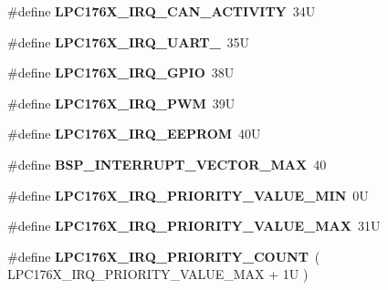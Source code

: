 \begin{DoxyCompactItemize}
\#define {\bfseries L\+P\+C176\+X\+\_\+\+I\+R\+Q\+\_\+\+C\+A\+N\+\_\+\+A\+C\+T\+I\+V\+I\+TY}~34U
\item 
\mbox{\label{group__bsp__interrupt_gaf81f39023853ed3450ee283a098018bb}} 
\#define {\bfseries L\+P\+C176\+X\+\_\+\+I\+R\+Q\+\_\+\+U\+A\+R\+T\+\_}~35U
\item 
\mbox{\label{group__bsp__interrupt_gaa4436fd9ee3ee9b28f0ffe563c03ef70}} 
\#define {\bfseries L\+P\+C176\+X\+\_\+\+I\+R\+Q\+\_\+\+G\+P\+IO}~38U
\item 
\mbox{\label{group__bsp__interrupt_ga1fde8394f565bde6a9b7adc08d360787}} 
\#define {\bfseries L\+P\+C176\+X\+\_\+\+I\+R\+Q\+\_\+\+P\+WM}~39U
\item 
\mbox{\label{group__bsp__interrupt_gad7230d2643d93b224dca1e8efb32bf14}} 
\#define {\bfseries L\+P\+C176\+X\+\_\+\+I\+R\+Q\+\_\+\+E\+E\+P\+R\+OM}~40U
\item 
\mbox{\label{group__bsp__interrupt_gae4a2cdda5816a4c83c2fac0a49880c6e}} 
\#define {\bfseries B\+S\+P\+\_\+\+I\+N\+T\+E\+R\+R\+U\+P\+T\+\_\+\+V\+E\+C\+T\+O\+R\+\_\+\+M\+AX}~40
\item 
\mbox{\label{group__bsp__interrupt_ga884bcbf1bdf7238b26c12e028c2ef737}} 
\#define {\bfseries L\+P\+C176\+X\+\_\+\+I\+R\+Q\+\_\+\+P\+R\+I\+O\+R\+I\+T\+Y\+\_\+\+V\+A\+L\+U\+E\+\_\+\+M\+IN}~0U
\item 
\mbox{\label{group__bsp__interrupt_gad4a95e44d2e48b6e08a38f9da1b4fefc}} 
\#define {\bfseries L\+P\+C176\+X\+\_\+\+I\+R\+Q\+\_\+\+P\+R\+I\+O\+R\+I\+T\+Y\+\_\+\+V\+A\+L\+U\+E\+\_\+\+M\+AX}~31U
\item 
\mbox{\label{group__bsp__interrupt_ga230545040a7e90fcb22d78e664c7989e}} 
\#define {\bfseries L\+P\+C176\+X\+\_\+\+I\+R\+Q\+\_\+\+P\+R\+I\+O\+R\+I\+T\+Y\+\_\+\+C\+O\+U\+NT}~( L\+P\+C176\+X\+\_\+\+I\+R\+Q\+\_\+\+P\+R\+I\+O\+R\+I\+T\+Y\+\_\+\+V\+A\+L\+U\+E\+\_\+\+M\+AX + 1\+U )
\item 
\mbox{\label{group__bsp__interrupt_ga067c1ccd5e3a840fd78637f18a6e6c29}} 

\end{DoxyCompactItemize}
